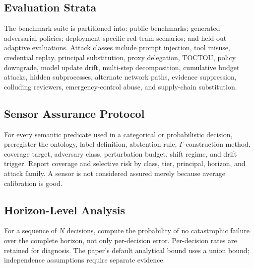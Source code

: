 \documentclass[11pt]{article}
\begin{document}
\subsection{Evaluation Strata}
The benchmark suite is partitioned into: public benchmarks; generated adversarial policies; deployment-specific red-team scenarios; and held-out adaptive evaluations. Attack classes include prompt injection, tool misuse, credential replay, principal substitution, proxy delegation, TOCTOU, policy downgrade, model update drift, multi-step decomposition, cumulative budget attacks, hidden subprocesses, alternate network paths, evidence suppression, colluding reviewers, emergency-control abuse, and supply-chain substitution.

\subsection{Sensor Assurance Protocol}
For every semantic predicate used in a categorical or probabilistic decision, preregister the ontology, label definition, abstention rule, \(\Gamma\)-construction method, coverage target, adversary class, perturbation budget, shift regime, and drift trigger. Report coverage and selective risk by class, tier, principal, horizon, and attack family. A sensor is not considered assured merely because average calibration is good.

\subsection{Horizon-Level Analysis}
For a sequence of \(N\) decisions, compute the probability of no catastrophic failure over the complete horizon, not only per-decision error. Per-decision rates are retained for diagnosis. The paper's default analytical bound uses a union bound; independence assumptions require separate evidence.
\end{document}

